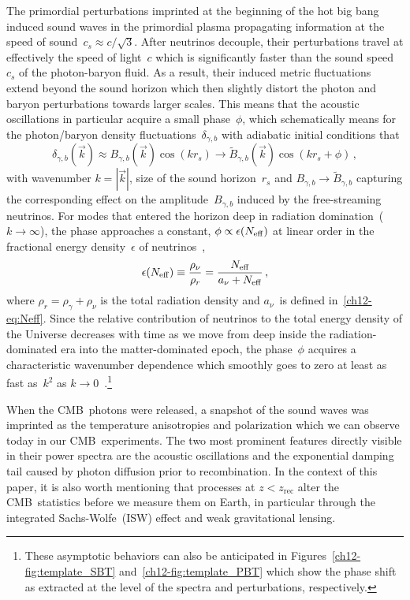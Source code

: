 The primordial perturbations imprinted at the beginning of the hot big bang induced sound waves in the primordial plasma propagating information at the speed of sound~$c_s \approx c/\sqrt{3}$. After neutrinos decouple, their perturbations travel at effectively the speed of light~$c$ which is significantly faster than the sound speed~$c_s$ of the photon-baryon fluid. As a result, their induced metric fluctuations extend beyond the sound horizon which then slightly distort the photon and baryon perturbations towards larger scales. This means that the acoustic oscillations in particular acquire a small phase~$\phi$, which schematically means for the photon/baryon density fluctuations~$\delta_{\gamma,b}$ with adiabatic initial conditions that
\begin{equation}
	\delta_{\gamma,b}(\vec{k}) \approx B_{\gamma,b}(\vec{k}) \cos(k r_s) \to \tilde{B}_{\gamma,b}(\vec{k}) \cos(k r_s + \phi)\, ,
\end{equation}
with wavenumber $k = |\vec{k}|$, size of the sound horizon~$r_s$ and $B_{\gamma,b} \to \tilde{B}_{\gamma,b}$ capturing the corresponding effect on the amplitude~$B_{\gamma,b}$ induced by the free-streaming neutrinos. For modes that entered the horizon deep in radiation domination~($k \to \infty$), the phase approaches a constant, $\phi \propto \epsilon(N_\mathrm{eff})$ at linear order in the fractional energy density~$\epsilon$ of neutrinos~\cite{Bashinsky:2003tk, Baumann:2015rya},
\begin{equation}
	\epsilon(N_\mathrm{eff}) \equiv \frac{\rho_\nu}{\rho_r} = \frac{N_\mathrm{eff}}{a_\nu + N_\mathrm{eff}} \, ,	\label{ch12-eq:fractional_density}
\end{equation}
where $\rho_r = \rho_\gamma + \rho_\nu$ is the total radiation density and $a_\nu$~is defined in~\eqref{ch12-eq:Neff}. Since the relative contribution of neutrinos to the total energy density of the Universe decreases with time as we move from deep inside the radiation-dominated era into the matter-dominated epoch, the phase~$\phi$ acquires a characteristic wavenumber dependence which smoothly goes to zero at least as fast as~$k^2$ as $k \to 0$~\cite{Baumann:2015rya}.\footnote{These asymptotic behaviors can also be anticipated in Figures~\ref{ch12-fig:template_SBT} and~\ref{ch12-fig:template_PBT} which show the phase shift as extracted at the level of the spectra and perturbations, respectively.}\medskip

When the CMB~photons were released, a snapshot of the sound waves was imprinted as the temperature anisotropies and polarization which we can observe today in our CMB~experiments. The two most prominent features directly visible in their power spectra are the acoustic oscillations and the exponential damping tail caused by photon diffusion prior to recombination. In the context of this paper, it is also worth mentioning that processes at $z < z_\mathrm{rec}$ alter the CMB~statistics before we measure them on Earth, in particular through the integrated Sachs-Wolfe~(ISW) effect and weak gravitational lensing.

